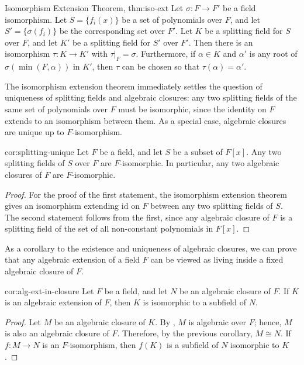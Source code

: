 \begin{Theorem}{Isomorphism Extension Theorem, \cite[Chapter 1]{Morandi1996}}{thm:iso-ext}
  Let $\sigma:F\to F'$ be a field isomorphism. Let $S=\{f_i(x)\}$ be a set of polynomials over $F$, and let $S'=\{\sigma(f_i)\}$ be the corresponding set over $F'$. Let $K$ be a splitting field for $S$ over $F$, and let $K'$ be a splitting field for $S'$ over $F'$. Then there is an isomorphism $\tau:K\to K'$ with $\tau|_F=\sigma$. Furthermore, if $\alpha\in K$ and $\alpha'$ is any root of $\sigma(\min(F,\alpha))$ in $K'$, then $\tau$ can be chosen so that $\tau(\alpha)=\alpha'$.
\end{Theorem}

The isomorphism extension theorem immediately settles the question of uniqueness of splitting fields and algebraic closures: any two splitting fields of the same set of polynomials over $F$ must be isomorphic, since the identity on $F$ extends to an isomorphism between them. As a special case, algebraic closures are unique up to $F$-isomorphism.

\begin{corolary}{}{cor:splitting-unique}
  Let $F$ be a field, and let $S$ be a subset of $F[x]$. Any two splitting fields of $S$ over $F$ are $F$-isomorphic. In particular, any two algebraic closures of $F$ are $F$-isomorphic.
\end{corolary}

\begin{proof}
  For the proof of the first statement, the isomorphism extension theorem gives an isomorphism extending $\mathrm{id}$ on $F$ between any two splitting fields of $S$. The second statement follows from the first, since any algebraic closure of $F$ is a splitting field of the set of all non-constant polynomials in $F[x]$.
\end{proof}

As a corollary to the existence and uniqueness of algebraic closures, we can prove that any algebraic extension of a field $F$ can be viewed as living inside a fixed algebraic closure of $F$.

\begin{corolary}{}{cor:alg-ext-in-closure}
  Let $F$ be a field, and let $N$ be an algebraic closure of $F$. If $K$ is an algebraic extension of $F$, then $K$ is isomorphic to a subfield of $N$.
\end{corolary}

\begin{proof}
  Let $M$ be an algebraic closure of $K$. By , $M$ is algebraic over $F$; hence, $M$ is also an algebraic closure of $F$. Therefore, by the previous corollary, $M\cong N$. If $f:M\to N$ is an $F$-isomorphism, then $f(K)$ is a subfield of $N$ isomorphic to $K$.
\end{proof}